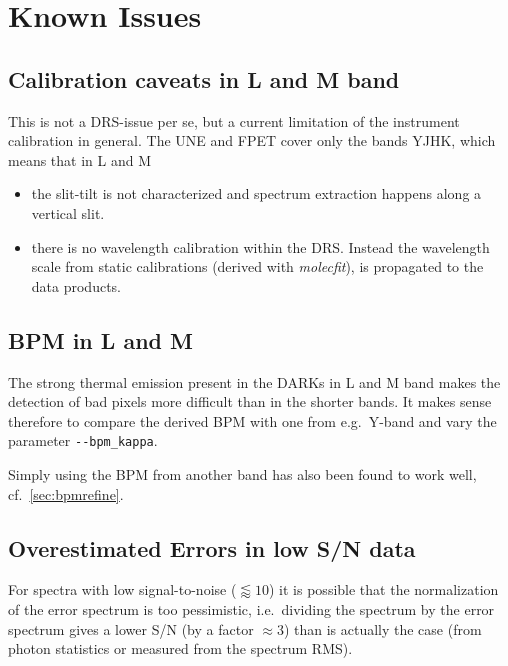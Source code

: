 \section{Known Issues}
\label{sec:knownissues}


\subsection{Calibration caveats in L and M band}

This is not a DRS-issue per se, but a current limitation of the instrument calibration in general. The UNE and FPET cover only the bands YJHK, which means that in L and M
\begin{itemize}
    \item the slit-tilt is not characterized and spectrum extraction happens along a vertical slit.
    \item there is no wavelength calibration within the DRS. Instead the wavelength scale from static calibrations (derived with \emph{molecfit}), is propagated to the data products.
\end{itemize}


\subsection{BPM in L and M}

The strong thermal emission present in the DARKs in L and M band makes the detection of bad pixels more difficult than in the shorter bands. It makes sense therefore to compare the derived BPM with one from e.g.~Y-band and vary the parameter \verb!--bpm_kappa!.

Simply using the BPM from another band has also been found to work well, cf.~\ref*{sec:bpmrefine}.

\subsection{Overestimated Errors in low S/N data}

For spectra with low signal-to-noise ($\lessapprox  10$) it is possible that the
normalization of the error spectrum is too pessimistic, i.e.~dividing the
spectrum by the error spectrum gives a lower S/N (by a factor $\approx 3$) than
is actually the case (from photon statistics or measured from the spectrum RMS).

